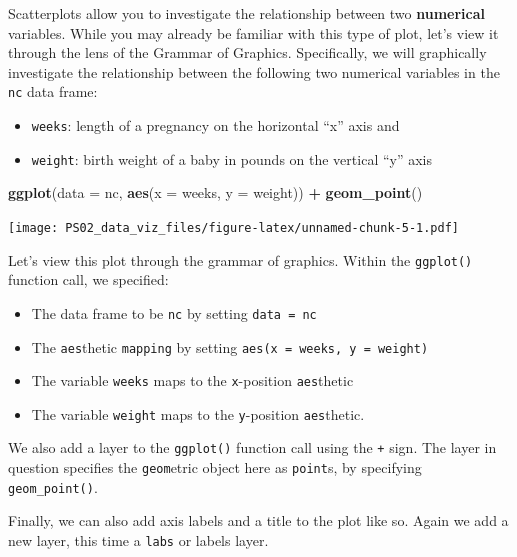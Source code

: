 \documentclass[]{article}
\newenvironment{Shaded}{\begin{snugshade}}{\end{snugshade}}
\newcommand{\DataTypeTok}[1]{\textcolor[rgb]{0.13,0.29,0.53}{#1}}
\newcommand{\KeywordTok}[1]{\textcolor[rgb]{0.13,0.29,0.53}{\textbf{#1}}}
\newcommand{\NormalTok}[1]{#1}
\newcommand{\OperatorTok}[1]{\textcolor[rgb]{0.81,0.36,0.00}{\textbf{#1}}}
\newcommand{\StringTok}[1]{\textcolor[rgb]{0.31,0.60,0.02}{#1}}
\providecommand{\tightlist}{%
  \setlength{\itemsep}{0pt}\setlength{\parskip}{0pt}}
\begin{document}
Scatterplots allow you to investigate the relationship between two
\textbf{numerical} variables. While you may already be familiar with
this type of plot, let's view it through the lens of the Grammar of
Graphics. Specifically, we will graphically investigate the relationship
between the following two numerical variables in the \texttt{nc} data
frame:

\begin{itemize}
\tightlist
\item
  \texttt{weeks}: length of a pregnancy on the horizontal ``x'' axis and
\item
  \texttt{weight}: birth weight of a baby in pounds on the vertical
  ``y'' axis
\end{itemize}

\begin{Shaded}
\begin{Highlighting}[]
\KeywordTok{ggplot}\NormalTok{(}\DataTypeTok{data =}\NormalTok{ nc, }\KeywordTok{aes}\NormalTok{(}\DataTypeTok{x =}\NormalTok{ weeks, }\DataTypeTok{y =}\NormalTok{ weight)) }\OperatorTok{+}\StringTok{ }
\StringTok{  }\KeywordTok{geom_point}\NormalTok{()}
\end{Highlighting}
\end{Shaded}

\texttt{[image: PS02\_data\_viz\_files/figure-latex/unnamed-chunk-5-1.pdf]}

Let's view this plot through the grammar of graphics. Within the
\texttt{ggplot()} function call, we specified:

\begin{itemize}
\tightlist
\item
  The data frame to be \texttt{nc} by setting \texttt{data\ =\ nc}
\item
  The \texttt{aes}thetic \texttt{mapping} by setting
  \texttt{aes(x\ =\ weeks,\ y\ =\ weight)}
\item
  The variable \texttt{weeks} maps to the \texttt{x}-position
  \texttt{aes}thetic
\item
  The variable \texttt{weight} maps to the \texttt{y}-position
  \texttt{aes}thetic.
\end{itemize}

We also add a layer to the \texttt{ggplot()} function call using the
\texttt{+} sign. The layer in question specifies the \texttt{geom}etric
object here as \texttt{point}s, by specifying \texttt{geom\_point()}.

Finally, we can also add axis labels and a title to the plot like so.
Again we add a new layer, this time a \texttt{labs} or labels layer.
\end{document}
